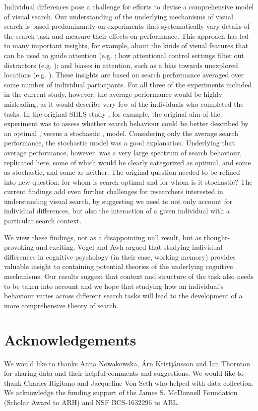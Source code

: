 \documentclass[twocolumn]{article}
\begin{document}
Individual differences pose a challenge for efforts to devise a comprehensive model of visual search. Our understanding of the underlying mechanisms of visual search is based predominantly on experiments that systematically vary details of the search task and measure their effects on performance. This approach has led to many important insights, for example, about the kinds of visual features that can be used to guide attention (e.g. \cite{treisman1980, wolfe2007}; how attentional control settings filter out distractors (e.g. \cite{folk1992,yantis1999}); and  biases in attention, such as a bias towards unexplored locations (e.g. \cite{klein2000}). These insights are based on search performance averaged over some number of individual participants. For all three of the experiments included in the current study, however, the average performance would be highly misleading, as it would describe very few of the individuals who completed the tasks. In the original SHLS study \cite{nowakowska2017}, for example, the original aim of the experiment was to assess whether search behaviour could be better described by an optimal \cite{najemnik-geisler2008}, versus a stochastic \cite{clarke2016}, model. Considering only the average search performance, the stochastic model was a good explanation. Underlying that average performance, however, was a very large spectrum of search behaviour, replicated here, some of which would be clearly categorized as optimal, and some as stochastic, and some as neither. The original question needed to be refined into new question: for whom is search optimal and for whom is it stochastic? The current findings add even further challenges for researchers interested in understanding visual search, by suggesting we need to not only account for individual differences, but also the interaction of a given individual with a particular search context. 

We view these findings, not as a disappointing null result, but as thought-provoking and exciting. Vogel and Awh\cite{vogel2008} argued that studying individual differences in cognitive psychology (in their case, working memory) provides valuable insight to containing potential theories of the underlying cognitive mechanisms. Our results suggest that context and structure of the task also needs to be taken into account and we hope that studying how an individual's behaviour varies across different search tasks will lead to the development of a more comprehensive theory of search. 


\section*{Acknowledgements}

We would like to thanks Anna Nowakowska, {\'A}rn Kristj{\'a}nsson and Ian Thornton for sharing data and their helpful comments and suggestions. We would like to thank Charles Rigitano and Jacqueline Von Seth who helped with data collection. We acknowledge the funding support of the James S. McDonnell Foundation (Scholar Award to ARH) and NSF BCS-1632296 to ABL.




\end{document}
